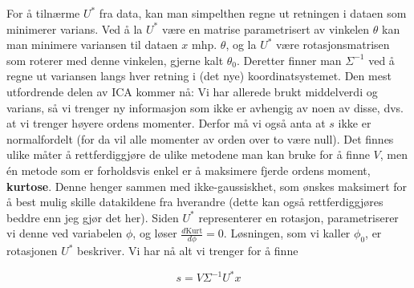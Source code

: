 For å tilnærme $U^*$ fra data, kan man simpelthen regne ut retningen i dataen som minimerer varians. Ved å la $U^*$ være en matrise parametrisert av vinkelen $\theta$ kan man minimere variansen til dataen $x$ mhp. $\theta$, og la $U^*$ være rotasjonsmatrisen som roterer med denne vinkelen, gjerne kalt $\theta_0$. Deretter finner man $\Sigma^{-1}$ ved å regne ut variansen langs hver retning i (det nye) koordinatsystemet. Den mest utfordrende delen av ICA kommer nå: Vi har allerede brukt middelverdi og varians, så vi trenger ny informasjon som ikke er avhengig av noen av disse, dvs. at vi trenger høyere ordens momenter. Derfor må vi også anta at $s$ ikke er normalfordelt (for da vil alle momenter av orden over to være null). Det finnes ulike måter å rettferdiggjøre de ulike metodene man kan bruke for å finne $V$, men én metode som er forholdsvis enkel er å maksimere fjerde ordens moment, \textbf{kurtose}. Denne henger sammen med ikke-gaussiskhet, som ønskes maksimert for å best mulig skille datakildene fra hverandre (dette kan også rettferdiggjøres beddre enn jeg gjør det her). Siden $U^*$ representerer en rotasjon, parametriserer vi denne ved variabelen $\phi$, og løser $\frac{d \textrm{Kurt}}{d \phi} = 0$. Løsningen, som vi kaller $\phi_0$, er rotasjonen $U^*$ beskriver. Vi har nå alt vi trenger for å finne

\begin{equation}
	s = V \Sigma^{-1} U^* x
\end{equation}
